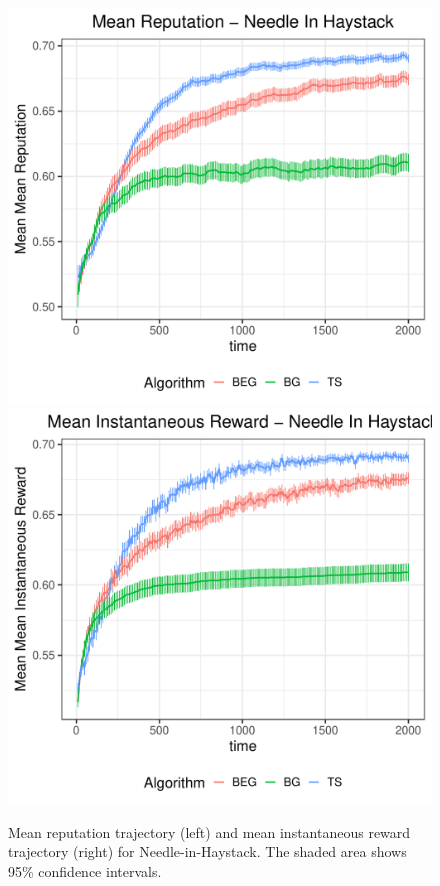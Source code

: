 \documentclass[../competing_bandits.tex]{subfiles}
\begin{document}
\begin{figure}
\centering
\includegraphics[scale=0.35]{ec19paper/figures/nih_mean}
\includegraphics[scale=0.35]{ec19paper/figures/mean_inst_reward_nih}
\caption{\footnotesize Mean reputation trajectory (left) and mean instantaneous reward trajectory (right) for Needle-in-Haystack. The shaded area shows 95\% confidence intervals.}
\label{prelim_means}
\end{figure}
\end{document}
